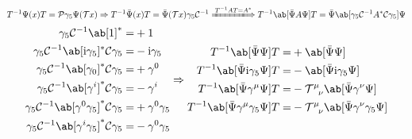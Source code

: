 \documentclass{article}
\newcommand{\calC}{\mathcal{C}}
\newcommand{\calP}{\mathcal{P}}
\newcommand{\calT}{\mathcal{T}}
\newcommand{\gammafive}{\gamma_5}
\newcommand{\gammamu}{\gamma^{\mu}}
\newcommand{\gammanu}{\gamma^{\nu}}
\newcommand{\rmi}{\mathrm{i}}
\begin{document}
\[ T^{-1} \Psi(x) T = \calP \gammafive \Psi(\calT x) \Rightarrow T^{-1} \bar{\Psi}(x) T = \bar{\Psi}(\calT x) \gammafive \calC^{-1} \xLongrightarrow{T^{-1} A T = A^*} T^{-1} \ab[\bar{\Psi} A \Psi] T = \bar{\Psi} \ab[\gammafive \calC^{-1} A^* \calC \gammafive] \Psi \]
\[ \begin{aligned}
        \gammafive \calC^{-1} \ab[1]^* =                                    & +1                    \\
        \gammafive \calC^{-1} \ab[\rmi \gammafive]^* \calC \gammafive =     & - \rmi \gammafive     \\
        \gammafive \calC^{-1} \ab[\gamma_0]^* \calC \gammafive =            & + \gamma^0            \\
        \gammafive \calC^{-1} \ab[\gamma^i]^* \calC \gammafive =            & - \gamma^i            \\
        \gammafive \calC^{-1} \ab[\gamma^0 \gammafive]^* \calC \gammafive = & + \gamma^0 \gammafive \\
        \gammafive \calC^{-1} \ab[\gamma^i \gammafive]^* \calC \gammafive = & - \gamma^0 \gammafive
    \end{aligned} \Rightarrow \begin{aligned}
        T^{-1} \ab[\bar{\Psi} \Psi] T =                     & + \ab[\bar{\Psi} \Psi]                                           \\
        T^{-1} \ab[\bar{\Psi} \rmi \gammafive \Psi] T =     & - \ab[\bar{\Psi} \rmi \gammafive \Psi]                           \\
        T^{-1} \ab[\bar{\Psi} \gammamu \Psi] T =            & - \calT^{\mu}_{\ \ \nu} \ab[\bar{\Psi} \gammanu \Psi]            \\
        T^{-1} \ab[\bar{\Psi} \gammamu \gammafive \Psi] T = & - \calT^{\mu}_{\ \ \nu} \ab[\bar{\Psi} \gammanu \gammafive \Psi]
    \end{aligned} \]
\end{document}

